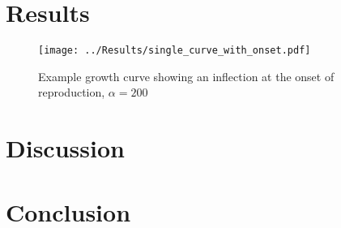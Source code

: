 \documentclass[a4paper]{article} %
\begin{document}
\section{Results}\thispagestyle{empty}

\begin{figure}[h]
    \texttt{[image: ../Results/single\_curve\_with\_onset.pdf]}
    \caption{Example growth curve showing an inflection at the onset of reproduction, $\alpha = 200$}
\end{figure}


\section{Discussion}\thispagestyle{empty}
\lipsum

\section{Conclusion}\thispagestyle{empty}
\lipsum

\newpage\let\mkbibnamefamily\textsc\printbibliography[title=Bibliography]\thispagestyle{empty} %


\end{document}
